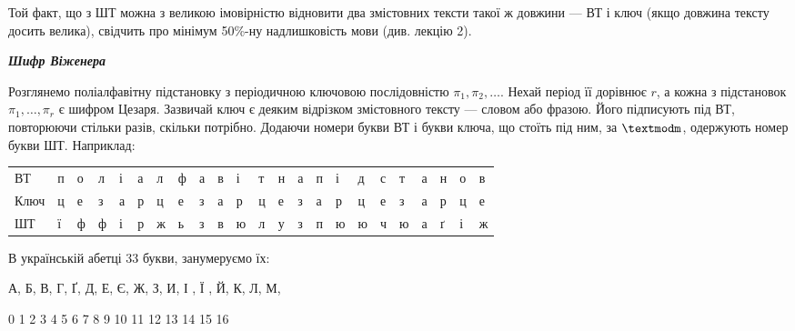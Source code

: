 Той факт, що з ШТ можна з великою імовірністю відновити два змістовних тексти
такої ж довжини --- ВТ і ключ (якщо довжина тексту досить велика), свідчить про
мінімум 50\%-ну надлишковість мови (див. лекцію 2).


\bigskip

{\centering\bfseries\itshape
Шифр Віженера
\par}


\bigskip


\bigskip

Розглянемо поліалфавітну підстановку з періодичною ключовою послідовністю  ${\pi
_{1},\pi _{2},\dots}$. Нехай період її дорівнює  $r$,
а кожна з підстановок  $\pi _{1},\dots,\pi _r$ є
шифром Цезаря. Зазвичай ключ є деяким відрізком змістовного тексту --- словом або
фразою. Його підписують під ВТ, повторюючи стільки разів, скільки потрібно.
Додаючи номери букви ВТ і букви ключа, що стоїть під ним, за  $\textmodm$,
одержують номер букви ШТ. Наприклад:


\bigskip


\bigskip

\begin{flushleft}
\tablehead{}
\begin{supertabular}{m{0.54135984in}m{0.17545986in}m{0.19765985in}m{0.19765985in}m{0.15805984in}m{0.16845983in}m{0.20595986in}m{0.19765985in}m{0.15805984in}m{0.16365984in}m{0.21705985in}m{0.17545986in}m{0.17545986in}m{0.15805984in}m{0.17545986in}m{0.21705985in}m{0.21705985in}m{0.16915983in}m{0.21705985in}m{0.15805984in}m{0.17545986in}m{0.17545986in}m{0.20595986in}}
ВТ  &
п &
о &
л &
і &
а &
л &
ф &
а &
в &
і &
т &
н &
а &
п &
і &
д &
с &
т &
а &
н &
о &
в\\
Ключ &
ц &
е &
з &
а &
р &
ц &
е &
з &
а &
р &
ц &
е &
з &
а &
р &
ц &
е &
з &
а &
р &
ц &
е\\
ШТ &
ї &
ф &
ф &
і &
р &
ж &
ь &
з &
в &
ю &
л &
у &
з &
п &
ю &
ю &
ч &
ю &
а &
ґ &
і &
ж\\
\end{supertabular}
\end{flushleft}

\bigskip

В українській абетці 33 букви, занумеруємо їх: 


\bigskip

{\centering
А,   Б,   В,   Г,  Ґ,  Д,   Е,   Є,   Ж,   З,   И,   І ,    Ї ,   Й,   К,   Л,  
М,
\par}

 0    1    2    3  4  5  6   7    8  9  10   11   12  13   14   15  16  

